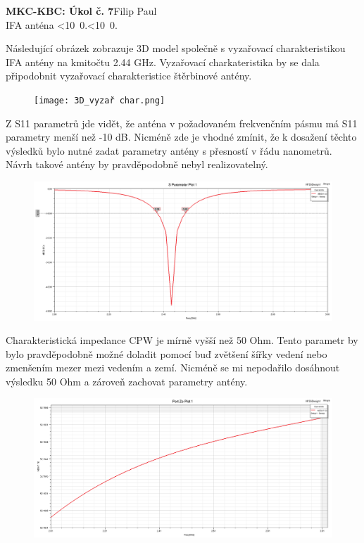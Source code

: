 \documentclass[10pt, a4paper]{article}%
\def\mydate{\leavevmode\hbox{\twodigits\day.\twodigits\month.\the\year}}
\def\twodigits#1{\ifnum#1<10 0\fi\the#1}
\begin{document}
\begin{flushleft}%
	\textbf{\Large{MKC-KBC: Úkol č. 7}}\hfill Filip Paul\\
	\large{IFA anténa \hfill\mydate}
\end{flushleft}
Následující obrázek zobrazuje 3D model společně s vyzařovací charakteristikou IFA antény
na kmitočtu 2.44 GHz. Vyzařovací charkateristika by se dala připodobnit vyzařovací charakteristice
štěrbinové antény.
\begin{figure}[ht!]
	\centering
	\texttt{[image: 3D\_vyzař char.png]}
\end{figure}

Z S11 parametrů jde vidět, že anténa v požadovaném frekvenčním pásmu má S11 parametry menší než -10 dB.
Nicméně zde je vhodné zmínit, že k dosažení těchto výsledků bylo nutné zadat parametry antény s přesností v řádu nanometrů.
Návrh takové antény by pravděpodobně nebyl realizovatelný.
\begin{figure}[ht!]
	\centering
	\includegraphics[width= 1\textwidth]{S Parameter Plot 1.png}
\end{figure}

Charakteristická impedance CPW je mírně vyšší než 50 Ohm. Tento parametr by bylo pravděpodobně možné 
doladit pomocí buď zvětšení šířky vedení nebo zmenšením mezer mezi vedením a zemí. Nicméně
se mi nepodařilo dosáhnout výsledku 50 Ohm a zároveň zachovat parametry antény. 
\begin{figure}[ht!]
	\centering
	\includegraphics[width= 1\textwidth]{Port Zo Plot 1.png}
\end{figure}
\end{document}
